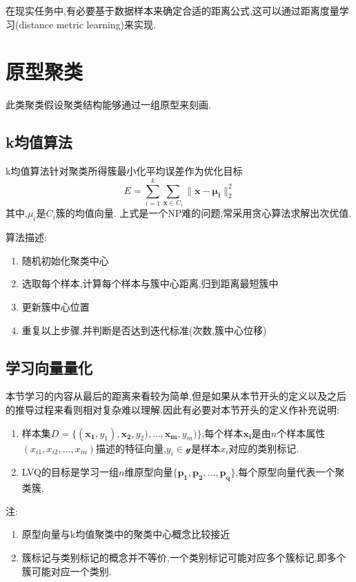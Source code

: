 在现实任务中,有必要基于数据样本来确定合适的距离公式,这可以通过距离度量学习(distance metric learning)来实现.

\section{原型聚类}

此类聚类假设聚类结构能够通过一组原型来刻画.

\subsection{k均值算法}

k均值算法针对聚类所得簇最小化平均误差作为优化目标
\begin{equation}
E=\sum_{i=1}^k\sum_{\mathbf{x}\in C_i}\|\mathbf{x-\mu_i}\|_2^2
\end{equation}
其中,$\mu_i$是$C_i$簇的均值向量.
上式是一个NP难的问题,常采用贪心算法求解出次优值.

算法描述:
\begin{enumerate}
\item 随机初始化聚类中心
\item 选取每个样本,计算每个样本与簇中心距离,归到距离最短簇中
\item 更新簇中心位置
\item 重复以上步骤,并判断是否达到迭代标准(次数,簇中心位移)
\end{enumerate}

\subsection{学习向量量化}

本节学习的内容从最后的距离来看较为简单,但是如果从本节开头的定义以及之后的推导过程来看则相对复杂难以理解.因此有必要对本节开头的定义作补充说明:
\begin{enumerate}
\item 样本集$D=\{(\mathbf{x_1}, y_1), \mathbf{x_2}, y_2), \dots, \mathbf{x_m}, y_m)\}$,每个样本$\mathbf{x_i}$是由$n$个样本属性$(x_{i1},x_{i2},\dots,x_{in})$描述的特征向量,$y_i\in\mathcal{y}$是样本$x_i$对应的类别标记.
\item LVQ的目标是学习一组$n$维原型向量$\{\mathbf{p_1,p_2,\dots,p_q}\}$,每个原型向量代表一个聚类簇.
\end{enumerate}
注:
\begin{enumerate}
\item 原型向量与k均值聚类中的聚类中心概念比较接近
\item 簇标记与类别标记的概念并不等价,一个类别标记可能对应多个簇标记,即多个簇可能对应一个类别.
\end{enumerate}

